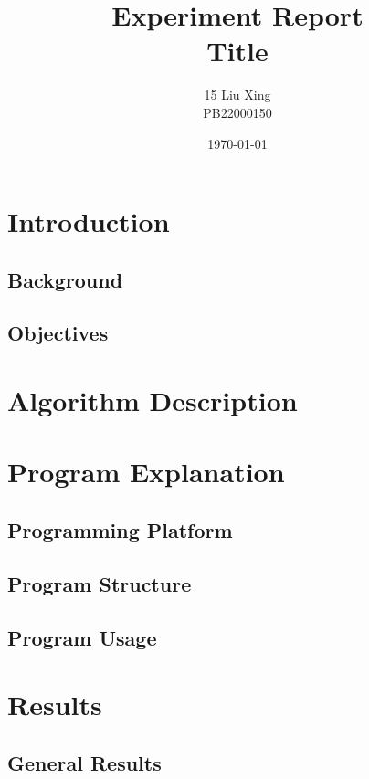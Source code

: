 \documentclass[12pt,a4paper]{report}
\title{
    \vspace{3cm}
    \textbf{Experiment Report}\\[0.5cm]
    \Large Title\\[0.5cm] %
    \vspace{2cm}
}
\author{15 Liu Xing \\ PB22000150}
\date{\today}
\begin{document}
\maketitle
\tableofcontents
\newpage

\chapter{Introduction}
    \section{Background}

    \section{Objectives}

\chapter{Algorithm Description}

\chapter{Program Explanation}
    \section{Programming Platform}

    \section{Program Structure}

    \section{Program Usage}

\chapter{Results}
    \section{General Results}
\end{document}
